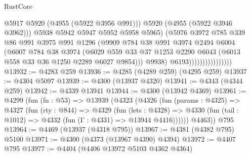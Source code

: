 \begin{lexlean}{RustCore}
\begin{coremodule}
                                        @5917
                                        @5920
                                        (@4955 (@5922 @3956 @991)))
                                      @5920
                                      (@4955 (@5922 @3946 @3962)))
                                    @5938
                                    @5942
                                    @5947
                                    @5952
                                    @5958
                                    @5965)
                                  (@5976
                                    @3972
                                    @785
                                    @339
                                    @86
                                    @991
                                    @3975
                                    @991
                                    @1296
                                    (@9909
                                      @784
                                      @38
                                      @991
                                      @3974
                                      @2494
                                      @6004
                                      (@6007
                                        @784
                                        @38
                                        @3974
                                        (@6029
                                          @559
                                          @33
                                          @37
                                          @1253
                                          @2290
                                          @6043
                                          (@6013 @558 @33 @36 @1250 @2289 @6027 @9854)))
                                      @9938)
                                    @6193))))))))))))))))
@13932 := @4283 @259
@13936 := @4285 (@4289 @259) (@4295 @259)
@13937 := @4304 @5097
@13939 := @4300 (@13937 @4320)
@13941 := @4343 (@4344 @259)
@13942 := @4339 @13941
@13944 := @4300 (@13942 @4369)
@13961 := @4299
    (fun (fn : @53) =>
    @13939
      (@4323
        (@4326
          (fun (params : @4325) =>
          @4327
            (fun (rty : @844) =>
            @4329
              (fun (lets : @4328) =>
              @4330 (fun (tail : @1012) => @4332 (fun (Γ : @4331) => @13944 @4416))))))
        @4463))
    @795
@13964 := @4469 (@13937 (@4318 @795))
@13967 := @4381 (@4382 @795) @5100
@13971 := @4300 (@4373 (@13967 @4390) @4394)
@13972 := @4407 @795
@13977 := @4404 (@4406 @13972 @5103 @4362 @4364)

\end{coremodule}
\end{lexlean}

